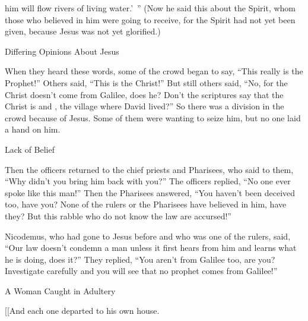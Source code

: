 {{{him
will flow
rivers
of living
water}}.’ ”
(Now
he said
this
about
the Spirit,
whom
those who believed
in
him
were going
to receive,
for
the Spirit
had
not yet
been given,
because
Jesus
was
not yet
glorified.)
\par }{\SH Differing Opinions About Jesus
\par }{\PP {}When
they heard
these
words,
some
of the crowd
began to say,
“This
really
is
the Prophet!”
Others
said,
“This
is
the Christ!” But
still others said,
“No,
for
the Christ
doesn’t come
from
Galilee, does he?
Don’t
the scriptures
say
that
the Christ
is
{}
and
{}, the village
where
David
lived?”
So
there was
a division
in
the crowd
because of
Jesus.
Some
of
them
were wanting
to seize
him,
but
no one
laid
a hand
on
him.
\par }{\SH Lack of Belief
\par }{\PP {}Then
the officers
returned
to
the chief priests
and
Pharisees,
who said
to them,
“Why
didn’t
you bring
him
back with you?”
The officers
replied,
“No one ever
spoke
like
this man!”
Then
the Pharisees
answered, “You
haven’t
been deceived
too, have you?
None
of
the rulers
or
the Pharisees
have believed
in
him, have they?
But
this
rabble
who do
not
know
the law
are
accursed!”
\par }{\PP {}Nicodemus,
who had gone
to
Jesus
before
and who was
one
of
the rulers,
said,
“Our
law
doesn’t
condemn
a man
unless
it
first
hears
from
him
and
learns
what
he is doing, does it?”
They replied, “You
aren’t
from
Galilee
too,
are you? Investigate carefully
and
you will see
that
no
prophet
comes
from
Galilee!”
\par }{\SH A Woman Caught in Adultery
\par }{\PP {}[[And
each one
departed
to
his own
house.

}
